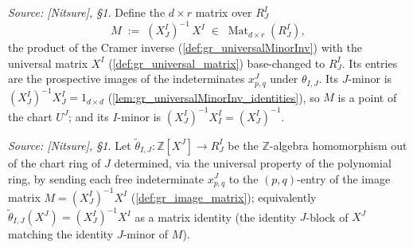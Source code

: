 \begin{definition}[The image matrix \(M = (X^I_J)^{-1} X^I\)]\leanok
  \label{def:gr_image_matrix}
  \textit{Source: [Nitsure], \S 1.}
  Define the \(d \times r\) matrix over \(R^I_J\)
  \[
    M \;:=\; (X^I_J)^{-1}\, X^I \;\in\; \operatorname{Mat}_{d \times r}(R^I_J),
  \]
  the product of the Cramer inverse (\cref{def:gr_universalMinorInv}) with the
  universal matrix \(X^I\) (\cref{def:gr_universal_matrix}) base-changed to
  \(R^I_J\). Its entries are the prospective images of the indeterminates
  \(x^J_{p,q}\) under \(\theta_{I,J}\). Its \(J\)-minor is \((X^I_J)^{-1} X^I_J =
  1_{d\times d}\) (\cref{lem:gr_universalMinorInv_identities}), so \(M\) is a
  point of the chart \(U^J\); and its \(I\)-minor is \((X^I_J)^{-1} X^I_I =
  (X^I_J)^{-1}\).
\end{definition}

\begin{definition}\leanok
  \label{def:gr_transition_pre}
  \textit{Source: [Nitsure], \S 1.}
  Let \(\tilde\theta_{I,J} : \mathbb{Z}[X^J] \to R^I_J\) be the
  \(\mathbb{Z}\)-algebra homomorphism out of the chart ring of \(J\) determined,
  via the universal property of the polynomial ring, by sending each free
  indeterminate \(x^J_{p,q}\) to the \((p,q)\)-entry of the image matrix \(M =
  (X^I_J)^{-1} X^I\) (\cref{def:gr_image_matrix}); equivalently
  \(\tilde\theta_{I,J}(X^J) = (X^I_J)^{-1} X^I\) as a matrix identity (the
  identity \(J\)-block of \(X^J\) matching the identity \(J\)-minor of \(M\)).
\end{definition}

